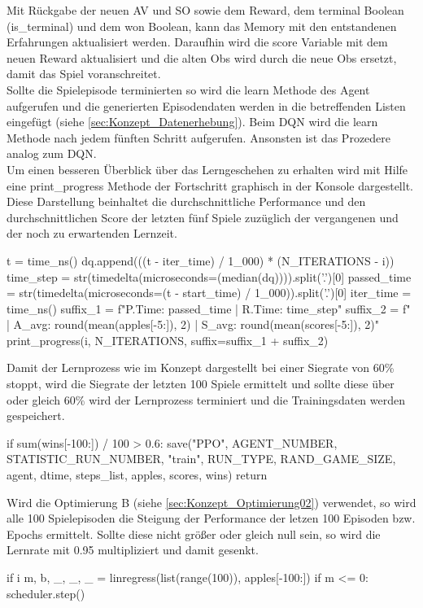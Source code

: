 Mit Rückgabe der neuen AV und SO sowie dem Reward, dem terminal Boolean (is\_terminal) und dem won Boolean, kann das Memory mit den entstandenen Erfahrungen aktualisiert werden. Daraufhin wird die score Variable mit dem neuen Reward aktualisiert und die alten Obs wird durch die neue Obs ersetzt, damit das Spiel voranschreitet.\\
Sollte die Spielepisode terminierten so wird die learn Methode des Agent aufgerufen und die generierten Episodendaten werden in die betreffenden Listen eingefügt (siehe \ref{sec:Konzept_Datenerhebung}). Beim DQN wird die learn Methode nach jedem fünften Schritt aufgerufen. Ansonsten ist das Prozedere analog zum DQN.\\
Um einen besseren Überblick über das Lerngeschehen zu erhalten wird mit Hilfe eine print\_progress Methode der Fortschritt graphisch in der Konsole dargestellt. Diese Darstellung beinhaltet die durchschnittliche Performance und den durchschnittlichen Score der letzten fünf Spiele zuzüglich der vergangenen und der noch zu erwartenden Lernzeit.
\begin{python}
	t = time_ns()
	dq.append(((t - iter_time) / 1_000) * (N_ITERATIONS - i))
	time_step = str(timedelta(microseconds=(median(dq)))).split('.')[0]
	passed_time = str(timedelta(microseconds=(t - start_time) / 1_000)).split('.')[0]
	iter_time = time_ns()
	suffix_1 = f"P.Time: {passed_time} | R.Time: {time_step}"
	suffix_2 = f" | A_avg: {round(mean(apples[-5:]), 2)} | S_avg: {round(mean(scores[-5:]), 2)}"
	print_progress(i, N_ITERATIONS, suffix=suffix_1 + suffix_2)
\end{python}
Damit der Lernprozess wie im Konzept dargestellt bei einer Siegrate von 60\% stoppt, wird die Siegrate der letzten 100 Spiele ermittelt und sollte diese über oder gleich 60\% wird der Lernprozess terminiert und die Trainingsdaten werden gespeichert.
\begin{python}
	if sum(wins[-100:]) / 100 > 0.6:
		save("PPO", AGENT_NUMBER, STATISTIC_RUN_NUMBER, "train", RUN_TYPE, RAND_GAME_SIZE, agent, dtime, steps_list, apples, scores, wins)
        return
\end{python}
Wird die Optimierung B (siehe \ref{sec:Konzept_Optimierung02}) verwendet, so wird alle 100 Spielepisoden die Steigung der Performance der letzen 100 Episoden bzw. Epochs ermittelt. Sollte diese nicht größer oder gleich null sein, so wird die Lernrate mit 0.95 multipliziert und damit gesenkt.
\begin{python}
	if i %
		m, b, _, _, _ = linregress(list(range(100)), apples[-100:])
		if m <= 0:
			scheduler.step()
\end{python}
